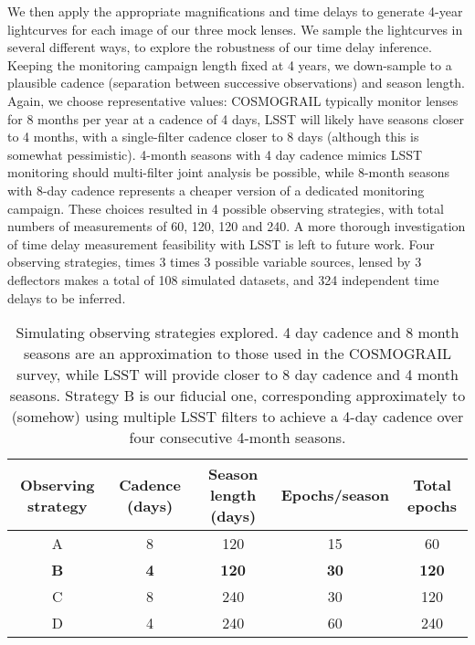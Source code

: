\documentclass[useAMS,usenatbib, a4paper]{mn2e} \usepackage{natbib}
\begin{document}
We then apply the appropriate magnifications and time delays to generate
4-year lightcurves for each image of our three mock lenses. We sample the
lightcurves in several different ways, to explore the robustness of our time
delay inference. Keeping the monitoring campaign length fixed at 4 years, we
down-sample to a plausible cadence (separation between successive
observations) and season length. Again, we choose representative values:
COSMOGRAIL \citep{cosmograil} typically monitor lenses for 8 months per year
at a cadence of 4 days, LSST will likely have seasons closer to 4 months, with
a single-filter cadence closer to 8 days (although this is somewhat
pessimistic). 4-month seasons with 4 day cadence mimics LSST monitoring should
multi-filter joint analysis be possible, while 8-month seasons with 8-day
cadence represents a cheaper version of a dedicated monitoring campaign. These
choices resulted in 4 possible observing strategies, with total numbers of
measurements of 60, 120, 120 and 240. A more thorough investigation of time
delay measurement feasibility with LSST is left to future work. Four observing
strategies, times 3 times 3 possible variable sources, lensed by 3 deflectors 
makes a total of 108 simulated datasets, and 324 independent time delays to be
inferred.

\begin{table*}
\begin{center}
\begin{tabular}{ccccc}
\hline
Observing strategy & Cadence (days) & Season length (days) 
& Epochs/season & Total epochs\\
\hline\hline
A  & 8  & 120 & 15  &  60 \\ 
\textbf{B}  & \textbf{4}  & \textbf{120} & \textbf{30}  & \textbf{120} \\
C  & 8  & 240 & 30  & 120 \\
D  & 4  & 240 & 60  & 240 \\
\hline
\end{tabular}
\end{center}
\caption{Simulating observing strategies explored. 4 day cadence and 8 month
seasons are an approximation to those used in the COSMOGRAIL survey, while
LSST will provide closer to 8 day cadence and 4 month seasons. Strategy B is
our fiducial one, corresponding approximately to (somehow) using multiple
LSST filters to achieve a 4-day cadence over four consecutive 4-month seasons.
\label{observing}}
\end{table*}
\end{document}
